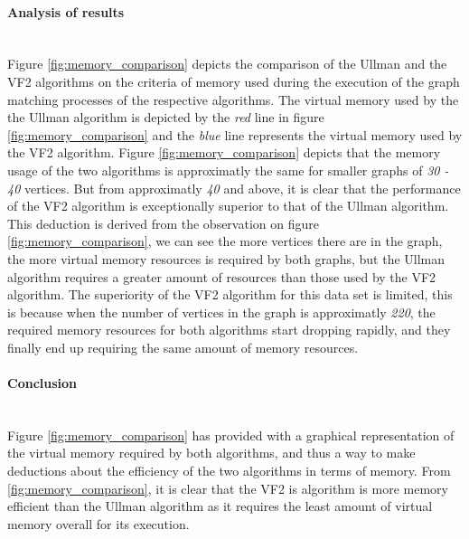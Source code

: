 \paragraph{Analysis of results}\mbox{}\\
Figure \ref{fig:memory_comparison} depicts the comparison of the Ullman and the VF2 algorithms on the criteria of memory used during the execution of the graph matching processes
of the respective algorithms.\newline\newline
The virtual memory used by the the Ullman algorithm is depicted by the \textit{red} line in figure \ref{fig:memory_comparison} and the \textit{blue} line
represents the virtual memory used by the VF2 algorithm.\newline\newline
Figure \ref{fig:memory_comparison} depicts that the memory usage of the two algorithms is approximatly the same for smaller graphs of \textit{30 - 40} 
vertices. But from approximatly \textit{40} and above, it is clear that the performance of the VF2 algorithm is exceptionally superior to that of the 
Ullman algorithm. This deduction is derived from the observation on figure \ref{fig:memory_comparison}, we can see the more vertices there are in 
the graph, the more virtual memory resources is required by both graphs, but the Ullman algorithm requires a greater amount of resources than those 
used by the VF2 algorithm.\newline\newline
The superiority of the VF2 algorithm for this data set is limited, this is because when the number of vertices in the graph is approximatly \textit{220}, 
the required memory resources for both algorithms start dropping rapidly, and they finally end up requiring the same amount of memory resources.

\paragraph{Conclusion}\mbox{}\\
Figure \ref{fig:memory_comparison} has provided with a graphical representation of the virtual memory required by both algorithms, and thus a way to
make deductions about the efficiency of the two algorithms in terms of memory.\newline\newline
From \ref{fig:memory_comparison}, it is clear that the VF2 is algorithm is more memory efficient than the Ullman algorithm as it requires the least amount 
of virtual memory overall for its execution.

